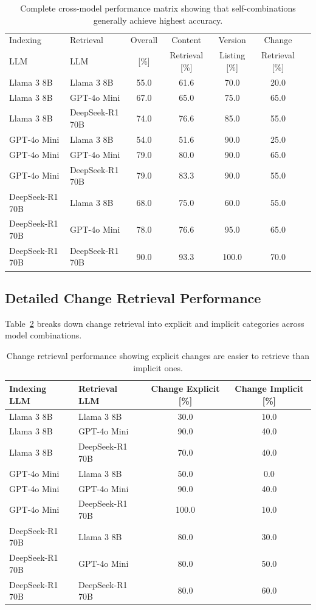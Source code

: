 \begin{table}[h]
\centering
\small
\caption{Complete cross-model performance matrix showing that self-combinations generally achieve highest accuracy.}
\begin{tabular}{llccccc}
\hline
Indexing & Retrieval & Overall & Content & Version & Change \\
LLM & LLM & [\%] & Retrieval [\%] & Listing [\%] & Retrieval [\%] \\ \hline
Llama 3 8B & Llama 3 8B & 55.0 & 61.6 & 70.0 & 20.0 \\
Llama 3 8B & GPT-4o Mini & 67.0 & 65.0 & 75.0 & 65.0 \\
Llama 3 8B & DeepSeek-R1 70B & 74.0 & 76.6 & 85.0 & 55.0 \\ \hline
GPT-4o Mini & Llama 3 8B & 54.0 & 51.6 & 90.0 & 25.0 \\
GPT-4o Mini & GPT-4o Mini & 79.0 & 80.0 & 90.0 & 65.0 \\
GPT-4o Mini & DeepSeek-R1 70B & 79.0 & 83.3 & 90.0 & 55.0 \\ \hline
DeepSeek-R1 70B & Llama 3 8B & 68.0 & 75.0 & 60.0 & 55.0 \\
DeepSeek-R1 70B & GPT-4o Mini & 78.0 & 76.6 & 95.0 & 65.0 \\
DeepSeek-R1 70B & DeepSeek-R1 70B & 90.0 & 93.3 & 100.0 & 70.0 \\ \hline
\end{tabular}
\label{tab:cross_model_full}
\end{table}

\subsection{Detailed Change Retrieval Performance}

Table~\ref{tab:change_detailed} breaks down change retrieval into explicit and implicit categories across model combinations.

\begin{table}[hb]
\centering
\small
\caption{Change retrieval performance showing explicit changes are easier to retrieve than implicit ones.}
\begin{tabular}{llcc}
\hline
Indexing LLM & Retrieval LLM & Change Explicit [\%] & Change Implicit [\%] \\ \hline
Llama 3 8B & Llama 3 8B & 30.0 & 10.0 \\
Llama 3 8B & GPT-4o Mini & 90.0 & 40.0 \\
Llama 3 8B & DeepSeek-R1 70B & 70.0 & 40.0 \\ \hline
GPT-4o Mini & Llama 3 8B & 50.0 & 0.0 \\
GPT-4o Mini & GPT-4o Mini & 90.0 & 40.0 \\
GPT-4o Mini & DeepSeek-R1 70B & 100.0 & 10.0 \\ \hline
DeepSeek-R1 70B & Llama 3 8B & 80.0 & 30.0 \\
DeepSeek-R1 70B & GPT-4o Mini & 80.0 & 50.0 \\
DeepSeek-R1 70B & DeepSeek-R1 70B & 80.0 & 60.0 \\ \hline
\end{tabular}
\label{tab:change_detailed}
\end{table}


